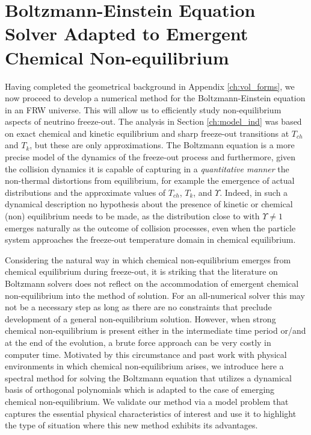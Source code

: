 \section{Boltzmann-Einstein Equation Solver Adapted to Emergent Chemical Non-equilibrium}\label{ch:boltz_orthopoly}

Having completed the geometrical background in Appendix \ref{ch:vol_forms}, we now proceed to develop a numerical method for the Boltzmann-Einstein equation in an FRW universe.  This will allow us to efficiently study  non-equilibrium aspects of neutrino freeze-out. The analysis in Section \ref{ch:model_ind} was based on exact chemical and kinetic equilibrium and sharp freeze-out transitions at $T_{ch}$ and $T_k$, but these are  only approximations.  The  Boltzmann equation is a more precise model of the dynamics of the freeze-out process and furthermore, given the collision dynamics it is capable of capturing in a {\em quantitative manner} the non-thermal distortions from equilibrium, for example the emergence of actual distributions and the approximate values  of $T_{ch}$, $T_k$, and $\Upsilon$.  Indeed,  in  such a dynamical description no hypothesis about the presence of kinetic or chemical (non) equilibrium needs to be made, as the distribution close to  with   $\Upsilon\ne  1$ emerges naturally as the outcome of collision processes, even when the particle system approaches the freeze-out temperature domain  in chemical equilibrium.

Considering the natural way in which chemical non-equilibrium emerges from chemical equilibrium during freeze-out, it is striking that the literature on Boltzmann solvers does not reflect on the accommodation of emergent chemical non-equilibrium into the method of solution. For an all-numerical solver this may not be a necessary step as long as there are no constraints that preclude development of a general non-equilibrium solution. However, when strong chemical non-equilibrium is present either in the intermediate time period or/and at the end of the evolution, a brute force approach can be very costly in computer time. Motivated by this circumstance and past work with physical environments in which chemical non-equilibrium arises,  we introduce here a  spectral method for solving the Boltzmann equation that utilizes a dynamical basis of orthogonal polynomials which is adapted to the case of emerging chemical non-equilibrium. We validate our method via a  model problem  that captures the essential physical characteristics of interest and use it to highlight the type of situation where this new method exhibits its advantages.

